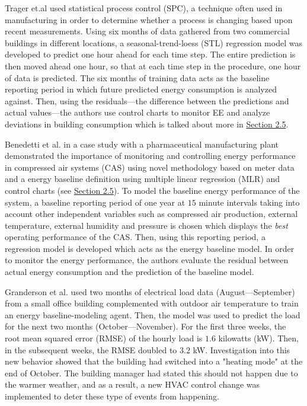 Trager et.al \cite{tightening} used statistical process control (SPC), a technique often used in manufacturing in order to determine whether a process is changing based upon recent measurements. Using six months of data gathered from two commercial buildings in different locations, a seasonal-trend-loess (STL) regression model was developed to predict one hour ahead for each time step. The entire prediction is then moved ahead one hour, so that at each time step in the procedure, one hour of data is predicted. The six months of training data acts as the baseline reporting period in which future predicted energy consumption is analyzed against. Then, using the residuals—the difference between the predictions and actual values—the authors use control charts to monitor EE and analyze deviations in building consumption which is talked about more in \hyperlink{subsection.2.5}{Section 2.5}. 


Benedetti et al. \cite{cas} in a case study with a pharmaceutical manufacturing plant demonstrated the importance of monitoring and controlling energy performance in compressed air systems (CAS) using novel methodology based on meter data and a energy baseline definition using multiple linear regression (MLR) and control charts (see \hyperlink{subsection.2.5}{Section 2.5}). To model the baseline energy performance of the system, a baseline reporting period of one year at $15$ minute intervals taking into account other independent variables such as compressed air production, external temperature, external humidity and pressure is chosen which displays the \textit{best} operating performance of the CAS. Then, using this reporting period, a regression model is developed which acts as the energy baseline model. In order to monitor the energy performance, the authors evaluate the residual between actual energy consumption and the prediction of the baseline model. 

Granderson et al. \cite{lawrence-lab} used two months of electrical load data (August—September) from a small office building complemented with outdoor air temperature to train an energy baseline-modeling agent. Then, the model was used to predict the load for the next two months (October—November). For the first three weeks, the root mean squared error (RMSE) of the hourly load is $1.6$ kilowatts (kW). Then, in the subsequent weeks, the RMSE doubled to $3.2$ kW. Investigation into this new behavior showed that the building had switched into a "heating mode" at the end of October. The building manager had stated this should not happen due to the warmer weather, and as a result, a new HVAC control change was implemented to deter these type of events from happening. 

